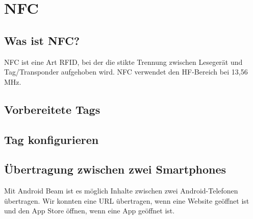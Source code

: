 \documentclass[a4paper,12pt]{scrartcl}
\begin{document}
\section{NFC}
\subsection{Was ist NFC?}
NFC ist eine Art RFID, bei der die stikte Trennung zwischen Lesegerät und Tag/Transponder aufgehoben wird.
NFC verwendet den HF-Bereich bei 13,56 MHz.
\subsection{Vorbereitete Tags}
\subsection{Tag konfigurieren}
\subsection{Übertragung zwischen zwei Smartphones}
Mit Android Beam ist es möglich Inhalte zwischen zwei Android-Telefonen übertragen.
Wir konnten eine URL übertragen, wenn eine Website geöffnet ist und den App Store
öffnen, wenn eine App geöffnet ist.
\end{document}
